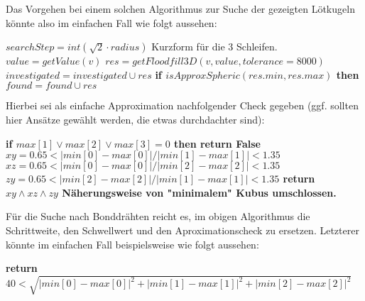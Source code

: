 Das Vorgehen  bei einem solchen Algorithmus zur Suche der gezeigten Lötkugeln könnte also im einfachen Fall wie folgt aussehen:
\newline
\begin{algorithmic}
\State $searchStep = int(\sqrt{2} \cdot radius)$
 \Comment \textnormal{Kurzform für die 3 Schleifen.} 
   \State $value = getValue(v)$
           \State $res = getFloodfill3D(v, value, tolerance = 8000)$
           \State $investigated = investigated \cup res$
           \State \bf{if} $isApproxSpheric(res.min, res.max)$ \bf{then} $found = found \cup res$  
       \EndIf
   \EndIf
\EndFor
\EndProcedure \newline
\end{algorithmic}

Hierbei sei als einfache Approximation nachfolgender Check gegeben (ggf. sollten hier Ansätze gewählt werden, die etwas durchdachter sind):
\newline
\begin{algorithmic}
\State \bf{if} $max[1] \lor max[2] \lor max[3] = 0$ \bf{then return} \textnormal{False}
\State $xy = 0.65 < |min[0]-max[0]|/|min[1]-max[1]| < 1.35$
\State $xz = 0.65 < |min[0]-max[0]|/|min[2]-max[2]| < 1.35$
\State $zy = 0.65 < |min[2]-max[2]|/|min[1]-max[1]| < 1.35$
\State \bf{return} $xy \land xz \land zy$ \Comment \textnormal{Näherungsweise von "minimalem" Kubus umschlossen.}
\EndProcedure \newline
\end{algorithmic}

Für die Suche nach Bonddrähten reicht es, im obigen Algorithmus die Schrittweite, den Schwellwert und den Aproximationscheck zu ersetzen. Letzterer könnte im einfachen Fall beispielsweise wie folgt aussehen:
\newline
\begin{algorithmic}
\State \bf{return} $40 < \sqrt{|min[0]-max[0]|^2 + |min[1]-max[1]|^2 + |min[2]-max[2]|^2}$
\EndProcedure \newline
\end{algorithmic}

